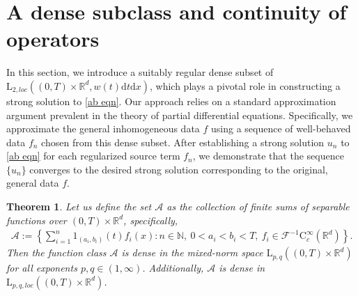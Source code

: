 \documentclass[11pt,reqno]{amsart}
\newtheorem{thm}{Theorem}[section]
\theoremstyle{definition}
\theoremstyle{remark}
\newcommand\bN{\mathbb{N}}
\newcommand\bR{\mathbb{R}}
\newcommand\cA{\mathcal{A}}
\newcommand\cF{\mathcal{F}}
\numberwithin{equation}{section}
\newcommand{\mysection}[1]{\section{#1}}
\begin{document}
\mysection{A dense subclass and continuity of operators}


In this section, we introduce a suitably regular dense subset of $\mathrm{L}_{2,loc}\left( (0,T) \times \bR^d, w(t)\mathrm{d}t\mathrm{d}x \right)$, which plays a pivotal role in constructing a strong solution to \eqref{ab eqn}. 
Our approach relies on a standard approximation argument prevalent in the theory of partial differential equations. 
Specifically, we approximate the general inhomogeneous data $f$ using a sequence of well-behaved data $f_n$ chosen from this dense subset. 
After establishing a strong solution $u_n$ to \eqref{ab eqn} for each regularized source term $f_n$, we demonstrate that the sequence $\{u_n\}$ converges to the desired strong solution corresponding to the original, general data $f$.

\begin{thm}
Let us define the set $\cA$ as the collection of finite sums of separable functions over $(0,T) \times \bR^d$, specifically,
\begin{align}
										\label{20230220 30}
\cA:=\left\{ \sum_{i=1}^n  1_{(a_i,b_i)}(t) f_i(x) : n \in \bN,~ 0<a_i<b_i<T,~ f_i \in \cF^{-1}\mathrm{C}_c^\infty(\bR^d) \right\}.
\end{align}
Then the function class $\cA$ is dense in the mixed-norm space $\mathrm{L}_{p,q}\left( (0,T) \times \bR^d \right)$ for all exponents $p, q \in (1,\infty)$.
Additionally, $\cA$ is dense in  $\mathrm{L}_{p,q,loc}\left( (0,T) \times \bR^d \right)$.
\end{thm}
\end{document}
